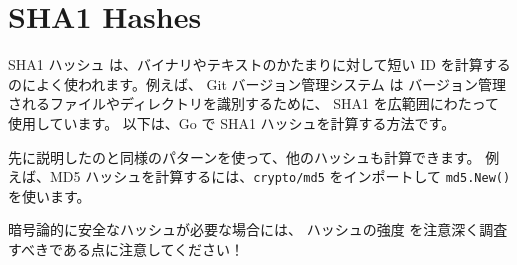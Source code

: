 \section{SHA1 Hashes}

SHA1 ハッシュ は、バイナリやテキストのかたまりに対して短い ID を計算するのによく使われます。例えば、 Git バージョン管理システム は バージョン管理されるファイルやディレクトリを識別するために、 SHA1 を広範囲にわたって使用しています。 以下は、Go で SHA1 ハッシュを計算する方法です。




先に説明したのと同様のパターンを使って、他のハッシュも計算できます。 例えば、MD5 ハッシュを計算するには、\texttt{crypto/md5} をインポートして \texttt{md5.New()} を使います。

暗号論的に安全なハッシュが必要な場合には、 ハッシュの強度 を注意深く調査すべきである点に注意してください！